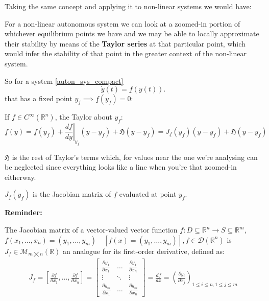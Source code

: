 \newpage
Taking the same concept and applying it to non-linear systems we would have:

For a non-linear autonomous system we can look at a zoomed-in portion of whichever equilibrium points we have and we may be able to locally approximate their stability by means of the \textbf{Taylor series} at that particular point, which would infer the stability of that point in the greater context of the non-linear system.

So for a system \ref{auton_sys_compact}
\[
\dot{y}(t) = \underline{f}(y(t)).
\] that has a fixed point $y_f \implies \underline{f}(y_f) = 0$:

If $f \in C^\infty(\mathbb{R}^n) $, the Taylor about $y_f$:
\begin{equation}\label{eq:t_taylor_expansion}
\underline{f}(y) = \underline{f}(y_f) + \left. \frac{d \underline{f}}{dy} \right|_{y_f}(y - y_f) + \mathfrak{H}(y - y_f) = J_{\underline{f}}(y_f)(y - y_f) + \mathfrak{H}(y - y_f) \tag{Taylor}
\end{equation}

$\mathfrak{H}$ is the rest of Taylor's terms which, for values near the one we're analysing can be neglected since everything looks like a line when you're that zoomed-in eitherway.

$J_{\underline{f}}(y_f)$ is the Jacobian matrix of $\underline{f}$ evaluated at point $y_f$.

\textbf{Reminder:}
\begin{definition}
The Jacobian matrix of a vector-valued vector function $f : D \subseteq \mathbb{R}^n \rightarrow S \subseteq \mathbb{R}^m$, $f(x_1, \dots, x_n) = (y_1, \dots , y_m) \quad [f(x) = (y_1, \dots , y_m)], f \in \mathcal{D}(\mathbb{R}^n)$ is $J_f \in \mathcal{M}_{m \bigtimes n}(\mathbb{R})$ an analogue for its first-order derivative, defined as:
\begin{align*}
	J_f = \left[ \frac{\partial f}{\partial x_1}, \dots , \frac{\partial f}{\partial x_n}  \right] =
	\begin{bmatrix*}
		\frac{\partial y_1}{\partial x_1} & \dots & \frac{\partial y_1}{\partial x_n} \\
		\vdots & \ddots & \vdots \\
		\frac{\partial y_m}{\partial x_1} & \dots &  \frac{\partial y_m}{\partial x_n}
	\end{bmatrix*} =
	\frac{df}{dx} =
	\left(   \frac{\partial y_i}{\partial x_j} \right)_{1 \leqslant i \leqslant n, 1 \leqslant j \leqslant m}
\end{align*}
\end{definition}

